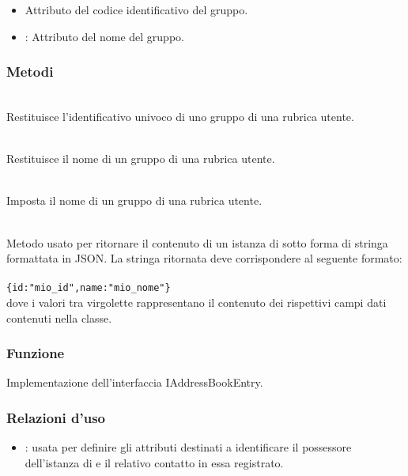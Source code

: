 \begin{itemize}
	\item{}
	Attributo del codice identificativo del gruppo.
	\item{}:
	Attributo del nome del gruppo.
\end{itemize}

\subsubsection*{Metodi}

\begin{description}
	\item{}\\
	Restituisce l'identificativo univoco di uno gruppo di una rubrica utente.
	\item{}\\
	Restituisce il nome di un gruppo di una rubrica utente.
	\item{}\\
	Imposta il nome di un gruppo di una rubrica utente.
	\item{}\\
	Metodo usato per ritornare il contenuto di un istanza di  sotto forma di stringa formattata in JSON. La stringa ritornata deve corrispondere al seguente formato:\\\\
	\verb|{id:"mio_id",name:"mio_nome"}|\\
	
	dove i valori tra virgolette rappresentano il contenuto dei rispettivi campi dati contenuti nella classe.
\end{description}


\subsubsection*{Funzione}
Implementazione dell'interfaccia IAddressBookEntry.

\subsubsection*{Relazioni d'uso}

\begin{itemize}
	\item {}: usata per definire gli attributi destinati a identificare il possessore dell'istanza di  e il relativo contatto in essa registrato.
\end{itemize}

